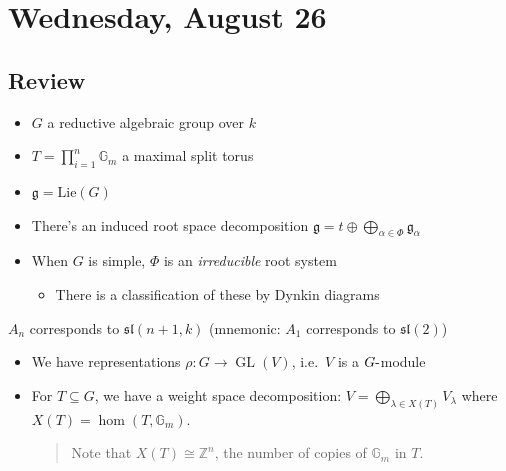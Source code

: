 \hypertarget{wednesday-august-26}{%
\section{Wednesday, August 26}\label{wednesday-august-26}}

\hypertarget{review}{%
\subsection{Review}\label{review}}

\begin{itemize}
\tightlist
\item
  \(G\) a reductive algebraic group over \(k\)
\item
  \(T = \prod_{i=1}^n {\mathbb{G}}_m\) a maximal split torus
\item
  \({\mathfrak{g}}= \mathrm{Lie}(G)\)
\item
  There's an induced root space decomposition
  \({\mathfrak{g}}= t\oplus \bigoplus_{\alpha\in \Phi}{\mathfrak{g}}_\alpha\)
\item
  When \(G\) is simple, \(\Phi\) is an \emph{irreducible} root system

  \begin{itemize}
  \tightlist
  \item
    There is a classification of these by Dynkin diagrams
  \end{itemize}
\end{itemize}

\begin{example}

\begin{example}

\(A_n\) corresponds to \({\mathfrak{sl}}(n+1, k)\) (mnemonic: \(A_1\)
corresponds to \({\mathfrak{sl}}(2)\))

\end{example}

\end{example}

\begin{itemize}
\item
  We have representations \(\rho: G\to \operatorname{GL}(V)\),
  i.e.~\(V\) is a \(G{\hbox{-}}\)module
\item
  For \(T\subseteq G\), we have a weight space decomposition:
  \(V = \bigoplus_{\lambda \in X(T)} V_\lambda\) where
  \(X(T) = \hom(T, {\mathbb{G}}_m)\).

  \begin{quote}
  Note that \(X(T) \cong {\mathbb{Z}}^n\), the number of copies of
  \({\mathbb{G}}_m\) in \(T\).
  \end{quote}
\end{itemize}

